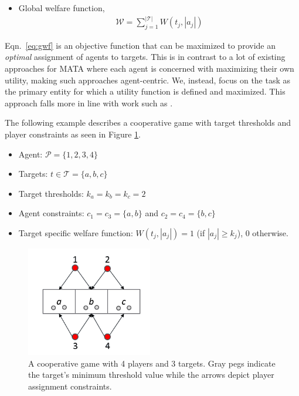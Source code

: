 \documentclass[defaultstyle,12pt]{thesis}
\newcommand{\Pl}{\mathcal{P}} %
\newcommand{\Ta}{\mathcal{T}} %
\newcommand{\We}{\mathcal{W}} %
\begin{document}
\begin{itemize}
	\item Global welfare function,
\begin{align}\label{eq:gwf}
	\We = \sum\limits_{j = 1}^{|\Ta|} W(t_j, |a_j|)
\end{align}
\end{itemize}

Eqn.~\eqref{eq:gwf} is an objective function that can be maximized to provide an \emph{optimal} assignment of agents to targets. This is in contrast to a lot of existing approaches for MATA where each agent is concerned with maximizing their own utility, making such approaches agent-centric. We, instead, focus on the task as the primary entity for which a utility function is defined and maximized. This approach falls more in line with work such as \cite{shehory1998methods}.

The following example describes a cooperative game with target thresholds and player constraints as seen in Figure \ref{fig:ex1}.
\begin{itemize}
	\item Agent: $\Pl = \{1,2,3,4\}$
	\item Targets: $t \in \Ta = \{a, b, c\}$
	\item Target thresholds: $k_a = k_b = k_c = 2$
	\item Agent constraints: $c_1 = c_3 = \{a, b\}$ and $c_2 = c_4 = \{b, c\}$
	\item Target specific welfare function: $W(t_j, |a_j|) = 1$ (if $|a_j| \geq k_j$), $0$ otherwise.
	
\end{itemize}
\begin{figure}[!htb]
	\centering\includegraphics[width=5.5cm]{../assets/ex1.png}
	\centering\caption{A cooperative game with 4 players and 3 targets. Gray pegs indicate the target's minimum threshold value while the arrows depict player assignment constraints.}\label{fig:ex1}
\end{figure}
\end{document}
